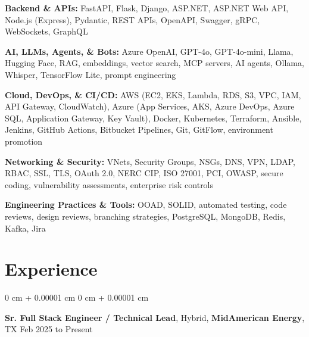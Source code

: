 \documentclass[10pt, letterpaper]{article}
\newenvironment{onecolentry}{
    \begin{adjustwidth}{
        0 cm + 0.00001 cm
    }{
        0 cm + 0.00001 cm
    }
}{
    \end{adjustwidth}
} %
\newcommand{\resumeheading}[2]{%
    \begin{onecolentry}
        #1 \hfill #2
    \end{onecolentry}
} %
\begin{document}
\vspace{0.12em}

\textbf{Backend \& APIs:}
FastAPI, Flask, Django, ASP.NET, ASP.NET Web API, Node.js (Express), Pydantic, REST APIs, OpenAPI, Swagger, gRPC, WebSockets, GraphQL

\vspace{0.12em}

\textbf{AI, LLMs, Agents, \& Bots:}
Azure OpenAI, GPT-4o, GPT-4o-mini, Llama, Hugging Face, RAG, embeddings, vector search, MCP servers, AI agents, Ollama, Whisper, TensorFlow Lite, prompt engineering

\vspace{0.12em}

\textbf{Cloud, DevOps, \& CI/CD:}
AWS (EC2, EKS, Lambda, RDS, S3, VPC, IAM, API Gateway, CloudWatch), Azure (App Services, AKS, Azure DevOps, Azure SQL, Application Gateway, Key Vault), Docker, Kubernetes, Terraform, Ansible, Jenkins, GitHub Actions, Bitbucket Pipelines, Git, GitFlow, environment promotion

\vspace{0.12em}

\textbf{Networking \& Security:}
VNets, Security Groups, NSGs, DNS, VPN, LDAP, RBAC, SSL, TLS, OAuth 2.0, NERC CIP, ISO 27001, PCI, OWASP, secure coding, vulnerability assessments, enterprise risk controls

\vspace{0.12em}

\textbf{Engineering Practices \& Tools:}
OOAD, SOLID, automated testing, code reviews, design reviews, branching strategies, PostgreSQL, MongoDB, Redis, Kafka, Jira



\section{Experience}

\resumeheading{\textbf{Sr. Full Stack Engineer / Technical Lead}, Hybrid, \textbf{MidAmerican Energy}, TX}{Feb 2025 to Present}
\end{document}
